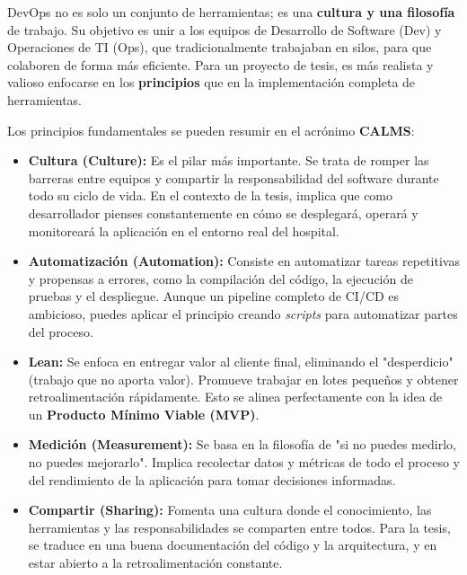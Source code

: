 \documentclass[12pt,a4paper]{article}
\begin{document}
DevOps no es solo un conjunto de herramientas; es una \textbf{cultura y una filosofía} de trabajo. Su objetivo es unir a los equipos de Desarrollo de Software (Dev) y Operaciones de TI (Ops), que tradicionalmente trabajaban en silos, para que colaboren de forma más eficiente. Para un proyecto de tesis, es más realista y valioso enfocarse en los \textbf{principios} que en la implementación completa de herramientas.

Los principios fundamentales se pueden resumir en el acrónimo \textbf{CALMS}:

\begin{itemize}
    \item \textbf{Cultura (Culture):} Es el pilar más importante. Se trata de romper las barreras entre equipos y compartir la responsabilidad del software durante todo su ciclo de vida. En el contexto de la tesis, implica que como desarrollador pienses constantemente en cómo se desplegará, operará y monitoreará la aplicación en el entorno real del hospital.

    \item \textbf{Automatización (Automation):} Consiste en automatizar tareas repetitivas y propensas a errores, como la compilación del código, la ejecución de pruebas y el despliegue. Aunque un pipeline completo de CI/CD es ambicioso, puedes aplicar el principio creando \textit{scripts} para automatizar partes del proceso.

    \item \textbf{Lean:} Se enfoca en entregar valor al cliente final, eliminando el "desperdicio" (trabajo que no aporta valor). Promueve trabajar en lotes pequeños y obtener retroalimentación rápidamente. Esto se alinea perfectamente con la idea de un \textbf{Producto Mínimo Viable (MVP)}.

    \item \textbf{Medición (Measurement):} Se basa en la filosofía de "si no puedes medirlo, no puedes mejorarlo". Implica recolectar datos y métricas de todo el proceso y del rendimiento de la aplicación para tomar decisiones informadas.

    \item \textbf{Compartir (Sharing):} Fomenta una cultura donde el conocimiento, las herramientas y las responsabilidades se comparten entre todos. Para la tesis, se traduce en una buena documentación del código y la arquitectura, y en estar abierto a la retroalimentación constante.
\end{itemize}
\end{document}
